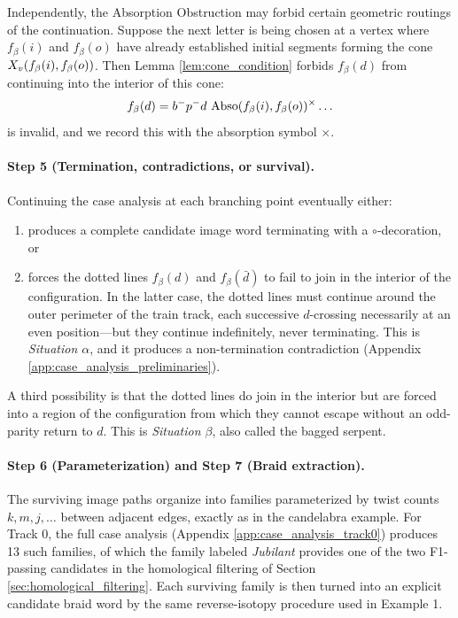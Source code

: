 Independently, the Absorption Obstruction may forbid certain geometric routings of the continuation. Suppose the next letter is being chosen at a vertex where $f_\beta(i)$ and $f_\beta(o)$ have already established initial segments forming the cone $X_v(f_\beta(i), f_\beta(o))$. Then Lemma \ref{lem:cone_condition} forbids $f_\beta(d)$ from continuing into the interior of this cone:
\[
f_\beta(d) = b^- p^- d\, \operatorname{Abso}(f_\beta(i), f_\beta(o))^\times \ldots
\]
is invalid, and we record this with the absorption symbol $\times$.

\paragraph{Step 5 (Termination, contradictions, or survival).} Continuing the case analysis at each branching point eventually either:
\begin{enumerate}
    \item produces a complete candidate image word terminating with a $\circ$-decoration, or
    \item forces the dotted lines $f_\beta(d)$ and $f_\beta(\bar{d})$ to fail to join in the interior of the configuration. In the latter case, the dotted lines must continue around the outer perimeter of the train track, each successive $d$-crossing necessarily at an even position---but they continue indefinitely, never terminating. This is \emph{Situation $\alpha$}, and it produces a non-termination contradiction (Appendix \ref{app:case_analysis_preliminaries}).
\end{enumerate}
A third possibility is that the dotted lines do join in the interior but are forced into a region of the configuration from which they cannot escape without an odd-parity return to $d$. This is \emph{Situation $\beta$}, also called the bagged serpent.

\paragraph{Step 6 (Parameterization) and Step 7 (Braid extraction).} The surviving image paths organize into families parameterized by twist counts $k, m, j, \ldots$ between adjacent edges, exactly as in the candelabra example. For Track 0, the full case analysis (Appendix \ref{app:case_analysis_track0}) produces 13 such families, of which the family labeled \emph{Jubilant} provides one of the two F1-passing candidates in the homological filtering of Section \ref{sec:homological_filtering}. Each surviving family is then turned into an explicit candidate braid word by the same reverse-isotopy procedure used in Example 1.

